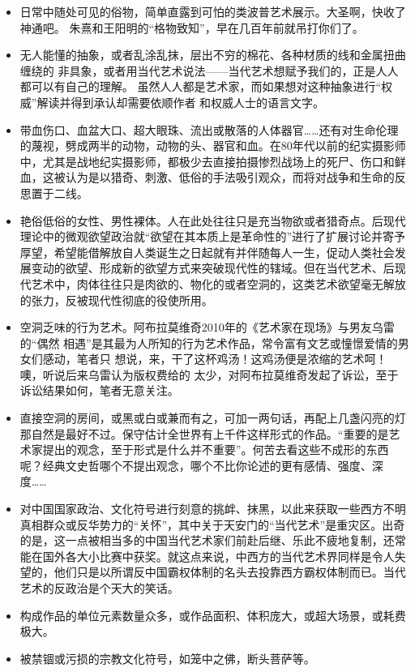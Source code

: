 \begin{itemize}

\item 日常中随处可见的俗物，简单直露到可怕的类波普艺术展示。大圣啊，快收了神通吧。
  朱熹和王阳明的“格物致知”，早在几百年前就吊打你们了。

\item 无人能懂的抽象，或者乱涂乱抹，层出不穷的棉花、各种材质的线和金属扭曲缠绕的
  非具象，或者用当代艺术说法——当代艺术想赋予我们的，正是人人都可以有自己的理解。
  虽然人人都是艺术家，而如果想对这种抽象进行“权威”解读并得到承认却需要依顺作者
  和权威人士的语言文字。

\item 带血伤口、血盆大口、超大眼珠、流出或散落的人体器官……还有对生命伦理的蔑视，劈成两半的动物，动物的头、器官和血。在80年代以前的纪实摄影师中，尤其是战地纪实摄影师，都极少去直接拍摄惨烈战场上的死尸、伤口和鲜血，这被认为是以猎奇、刺激、低俗的手法吸引观众，而将对战争和生命的反思置于二线。

\item 艳俗低俗的女性、男性裸体。人在此处往往只是充当物欲或者猎奇点。后现代理论中的微观欲望政治就“欲望在其本质上是革命性的”进行了扩展讨论并寄予厚望，希望能借解放自人类诞生之日起就有并伴随每人一生，促动人类社会发展变动的欲望、形成新的欲望方式来突破现代性的辖域。但在当代艺术、后现代艺术中，肉体往往只是肉欲的、物化的或者空洞的，这类艺术欲望毫无解放的张力，反被现代性彻底的役使所用。

\item 空洞乏味的行为艺术。阿布拉莫维奇2010年的《艺术家在现场》与男友乌雷的“偶然
  相遇”是其最为人所知的行为艺术作品，常令富有文艺或憧憬爱情的男女们感动，笔者只
  想说，来，干了这杯鸡汤！这鸡汤便是浓缩的艺术呵！噢，听说后来乌雷认为版权费给的
  太少，对阿布拉莫维奇发起了诉讼，至于诉讼结果如何，笔者无意关注。

\item 直接空洞的房间，或黑或白或兼而有之，可加一两句话，再配上几盏闪亮的灯那自然是最好不过。保守估计全世界有上千件这样形式的作品。“重要的是艺术家提出的观念，至于形式是什么并不重要”。何苦去看这些不成形的东西呢？经典文史哲哪个不提出观念，哪个不比你论述的更有感情、强度、深度……

\item 对中国国家政治、文化符号进行刻意的挑衅、抹黑，以此来获取一些西方不明真相群众或反华势力的“关怀”，其中关于天安门的“当代艺术”是重灾区。出奇的是，这一点被相当多的中国当代艺术家们前赴后继、乐此不疲地复制，还常能在国外各大小比赛中获奖。就这点来说，中西方的当代艺术界同样是令人失望的，他们只是以所谓反中国霸权体制的名头去投靠西方霸权体制而已。当代艺术的反政治是个天大的笑话。

\item 构成作品的单位元素数量众多，或作品面积、体积庞大，或超大场景，或耗费极大。

\item 被禁锢或污损的宗教文化符号，如笼中之佛，断头菩萨等。

\end{itemize}


